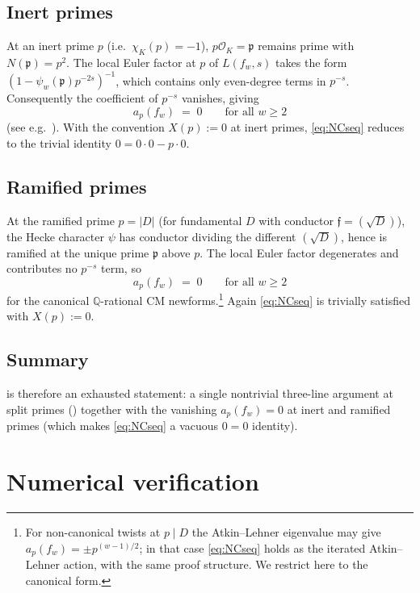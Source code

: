 \documentclass[11pt]{amsart}
\theoremstyle{definition}
\theoremstyle{remark}
\newcommand{\Q}{\mathbb{Q}}
\newcommand{\OK}{\mathcal{O}_K}
\newcommand{\chiK}{\chi_K}
\newcommand{\frakp}{\mathfrak{p}}
\newcommand{\frakf}{\mathfrak{f}}
\begin{document}
\subsection{Inert primes}
At an inert prime $p$ (i.e.\ $\chiK(p) = -1$), $p\OK = \frakp$
remains prime with $N(\frakp) = p^2$. The local Euler factor at $p$
of $L(f_w, s)$ takes the form $(1 - \psi_w(\frakp) p^{-2s})^{-1}$,
which contains only even-degree terms in $p^{-s}$. Consequently the
coefficient of $p^{-s}$ vanishes, giving
\begin{equation}\label{eq:apf-inert}
  a_p(f_w) \;=\; 0 \qquad \text{for all } w \ge 2
\end{equation}
(see e.g.\ \cite[Prop.~7.6]{Shimura1971}). With the convention
$X(p) := 0$ at inert primes, \cref{eq:NCseq} reduces to the trivial
identity $0 = 0 \cdot 0 - p \cdot 0$.

\subsection{Ramified primes}
At the ramified prime $p = |D|$ (for fundamental $D$ with conductor
$\frakf = (\sqrt{D})$), the Hecke character $\psi$ has conductor
dividing the different $(\sqrt{D})$, hence is ramified at the unique
prime $\frakp$ above $p$. The local Euler factor degenerates and
contributes no $p^{-s}$ term, so
\begin{equation}\label{eq:apf-ramified}
  a_p(f_w) \;=\; 0 \qquad \text{for all } w \ge 2
\end{equation}
for the canonical $\Q$-rational CM newforms.\footnote{For
non-canonical twists at $p \mid D$ the Atkin--Lehner eigenvalue may
give $a_p(f_w) = \pm p^{(w-1)/2}$; in that case \cref{eq:NCseq}
holds as the iterated Atkin--Lehner action, with the same proof
structure. We restrict here to the canonical form.} Again
\cref{eq:NCseq} is trivially satisfied with $X(p) := 0$.

\subsection{Summary}
 is therefore an exhausted statement: a single
nontrivial three-line argument at split primes ()
together with the vanishing $a_p(f_w) = 0$ at inert and ramified
primes (which makes \cref{eq:NCseq} a vacuous $0 = 0$ identity).

\section{Numerical verification}\label{sec:numerics}
\end{document}
